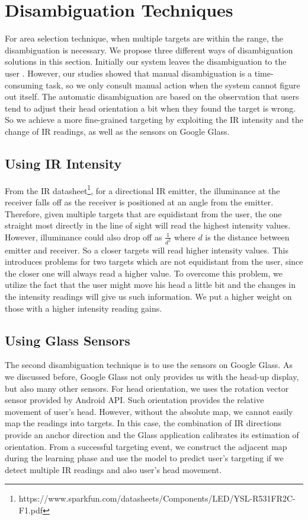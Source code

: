 \section{Disambiguation Techniques}
\label{sec:disamb-techn}

For area selection technique, when multiple targets are within the range, the disambiguation is necessary. We propose three different ways of disambiguation solutions in this section. Initially our system leaves the disambiguation to the user . However, our studies showed that manual disambiguation is a time-consuming task, so we only consult manual action when the system cannot figure out itself. The automatic disambiguation are based on the observation that users tend to adjust their head orientation a bit when they found the target is wrong. So we achieve a more fine-grained targeting by exploiting the IR intensity and the change of IR readings, as well as the sensors on Google Glass.

\subsection{Using IR Intensity}
\label{sec:using-ir-intensity}

From the IR datasheet\footnote{https://www.sparkfun.com/datasheets/Components/LED/YSL-R531FR2C-F1.pdf}, for a directional IR emitter, the illuminance at the receiver falls off as the receiver is positioned at an angle from the emitter. Therefore, given multiple targets that are equidistant from the user, the one straight most directly in the line of sight will read the highest intensity values. However, illuminance could also drop off as $\frac{1}{d^2}$ where $d$ is the distance between emitter and receiver. So a closer targets will read higher intensity values. This introduces problems for two targets which are not equidistant from the user, since the closer one will always read a higher value. To overcome this problem, we utilize the fact that the user might move his head a little bit and the changes in the intensity readings will give us such information. We put a higher weight on those with a higher intensity reading gains.

\subsection{Using Glass Sensors}
\label{sec:using-glass-sensors}
The second disambiguation technique is to use the sensors on Google Glass. As we discussed before, Google Glass not only provides us with the head-up display, but also many other sensors. For head orientation, we uses the rotation vector sensor provided by Android API. Such orientation provides the relative movement of user's head. However, without the absolute map, we cannot easily map the readings into targets. In this case, the combination of IR directions provide an anchor direction and the Glass application calibrates its estimation of orientation. From a successful targeting event, we construct the adjacent map during the learning phase and use the model to predict user's targeting if we detect multiple IR readings and also user's head movement. 

